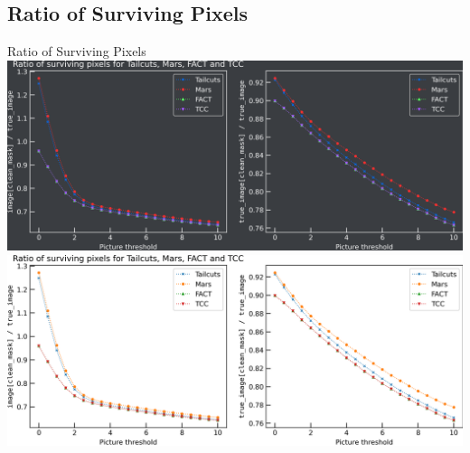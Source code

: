 \subsection{Ratio of Surviving Pixels}
\begin{frame}{Ratio of Surviving Pixels}
  \ifdefined\darktheme
    \centering
    \includegraphics[width=\textwidth]{plots/surv_pixels_dark.png}
  \else
    \centering
    \includegraphics[width=\textwidth]{plots/surv_pixels_light.png}
  \fi
\end{frame}

